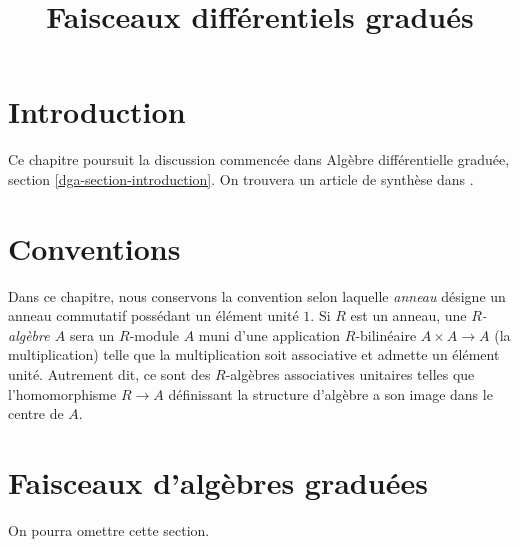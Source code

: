 

%


\title{Faisceaux différentiels gradués}


\maketitle

\label{section-phantom}

\tableofcontents

\section{Introduction}
\label{section-introduction}

\noindent
Ce chapitre poursuit la discussion commencée dans
Algèbre différentielle graduée, section \ref{dga-section-introduction}.
On trouvera un article de synthèse dans \cite{Keller-survey}.




\section{Conventions}
\label{section-conventions}

\noindent
Dans ce chapitre, nous conservons la convention selon laquelle {\it anneau} désigne un
anneau commutatif possédant un élément unité $1$. Si $R$ est un anneau, une {\it $R$-algèbre $A$}
sera un $R$-module $A$ muni d'une application $R$-bilinéaire $A \times A \to A$
(la multiplication) telle que la multiplication soit associative et admette un
élément unité.
Autrement dit, ce sont des $R$-algèbres associatives unitaires
telles que l'homomorphisme $R \to A$ définissant la structure d'algèbre a son image dans le centre de $A$.








\section{Faisceaux d'algèbres graduées}
\label{section-ga}

\noindent
On pourra omettre cette section.

